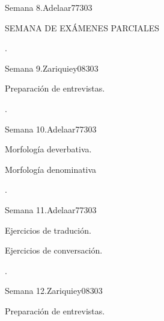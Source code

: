 \begin{syllabus}
\begin{unit}{Semana 8.}{}{Adelaar77}{30}{3}
   \begin{topics}
      \item SEMANA DE EXÁMENES PARCIALES
   \end{topics}

   \begin{learningoutcomes}
      \item .
   \end{learningoutcomes}
\end{unit}

\begin{unit}{Semana 9.}{}{Zariquiey08}{30}{3}
   \begin{topics}
      \item Preparación de entrevistas.
   \end{topics}

   \begin{learningoutcomes}
      \item .
   \end{learningoutcomes}
\end{unit}

\begin{unit}{Semana 10.}{}{Adelaar77}{30}{3}
   \begin{topics}
      \item Morfología deverbativa.
      \item Morfología denominativa
   \end{topics}

   \begin{learningoutcomes}
      \item .
   \end{learningoutcomes}
\end{unit}

\begin{unit}{Semana 11.}{}{Adelaar77}{30}{3}
   \begin{topics}
      \item Ejercicios de tradución.
      \item Ejercicios de conversación.
   \end{topics}

   \begin{learningoutcomes}
      \item . 
   \end{learningoutcomes}
\end{unit}

\begin{unit}{Semana 12.}{}{Zariquiey08}{30}{3}
   \begin{topics}
      \item Preparación de entrevistas.
   \end{topics}


\end{unit}
\end{syllabus}
